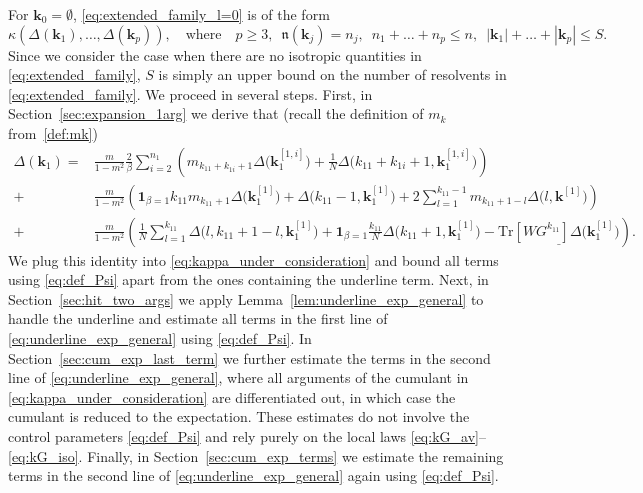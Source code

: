 \documentclass[10pt]{amsart}
\numberwithin{equation}{section}
\begin{document}
For $\bm{k}_0=\emptyset$, \eqref{eq:extended_family_l=0} is of the form
\begin{equation}
\kappa\left(\Delta(\bm{k}_1),\ldots,\Delta(\bm{k}_p)\right),\quad\text{where}\quad p\ge 3,\,\,\, \mathfrak{n}(\bm{k}_j)=n_j,\,\,\, n_1+\ldots+n_p\le n,\,\,\, |\bm{k}_1|+\ldots+|\bm{k}_p|\le S.
\label{eq:kappa_under_consideration}
\end{equation}
Since we consider the case when there are no isotropic quantities in \eqref{eq:extended_family}, $S$ is simply an upper bound on the number of resolvents in \eqref{eq:extended_family}. We proceed in several steps. First, in Section~\ref{sec:expansion_1arg} we derive  that (recall the definition of $m_k$ 
from~\eqref{def:mk})
\begin{equation}
\begin{split}
\Delta(\bm{k}_1) =& \frac{m}{1-m^2} \frac{2}{\beta}\sum_{i=2}^{n_1} \left(m_{k_{11}+k_{1i}+1}\Delta\big(\bm{k}_1^{[1,i]}\big) +\frac{1}{N}\Delta\big(k_{11}+k_{1i}+1,\bm{k}_1^{[1,i]}\big) \right)\\
+& \frac{m}{1-m^2}\left(\bm{1}_{\beta=1}k_{11}m_{k_{11}+1}\Delta\big(\bm{k}_1^{[1]}\big) + \Delta\big(k_{11}-1, \bm{k}_1^{[1]}\big) + 2\sum_{l=1}^{k_{11}-1} m_{k_{11}+1-l} \Delta\big(l,\bm{k}^{[1]}\big)\right)\\
 +&\frac{m}{1-m^2}\left(\frac{1}{N}\sum_{l=1}^{k_{11}}\Delta\big(l,k_{11}+1-l,\bm{k}_1^{[1]}\big) + \bm{1}_{\beta=1} \frac{k_{11}}{N}\Delta\big(k_{11}+1,\bm{k}_1^{[1]}\big) - \underline{\mathrm{Tr}\left[WG^{k_{11}}\right]\Delta\big(\bm{k}^{[1]}_1\big)}\right).
\end{split}
\label{eq:Delta_bmk_expansion}
\end{equation}
We plug this identity into \eqref{eq:kappa_under_consideration} and bound all terms using \eqref{eq:def_Psi} apart from the ones containing the  underline term. Next, in Section~\ref{sec:hit_two_args} we apply Lemma~\ref{lem:underline_exp_general} to handle the underline and estimate all terms in the first line of \eqref{eq:underline_exp_general} using \eqref{eq:def_Psi}. In Section~\ref{sec:cum_exp_last_term} we further estimate the terms in the second line of \eqref{eq:underline_exp_general}, where all arguments of the cumulant in \eqref{eq:kappa_under_consideration} are differentiated out, in which case the cumulant is reduced to the expectation. These estimates do not involve the control parameters \eqref{eq:def_Psi} and rely purely on the local laws \eqref{eq:kG_av}--\eqref{eq:kG_iso}. Finally, in Section~\ref{sec:cum_exp_terms} we estimate the remaining terms in the second line of \eqref{eq:underline_exp_general} again using \eqref{eq:def_Psi}.
\end{document}
